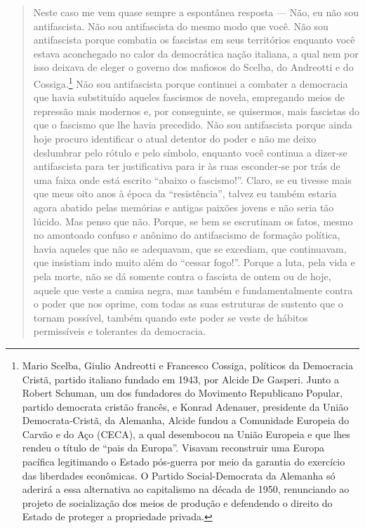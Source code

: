 \begin{quote}
Neste caso me vem quase sempre a espontânea resposta --- Não, eu não sou
antifascista. Não sou antifascista do mesmo modo que você. Não sou
antifascista porque combatia os fascistas em seus territórios enquanto
você estava aconchegado no calor da democrática nação italiana, a qual
nem por isso deixava de eleger o governo dos mafiosos do Scelba, do
Andreotti e do Cossiga.\footnote{Mario Scelba, Giulio Andreotti e Francesco Cossiga, políticos da
  Democracia Cristã, partido italiano fundado em 1943, por Alcide De
  Gasperi. Junto a Robert Schuman, um dos fundadores do Movimento
  Republicano Popular, partido democrata cristão francês, e Konrad
  Adenauer, presidente da União Democrata-Cristã, da Alemanha, Alcide
  fundou a Comunidade Europeia do Carvão e do Aço (CECA), a qual
  desembocou na União Europeia e que lhes rendeu o título de ``pais da
  Europa''. Visavam reconstruir uma Europa pacífica legitimando o Estado
  pós-guerra por meio da garantia do exercício das liberdades
  econômicas. O Partido Social-Democrata da Alemanha só aderirá a essa
  alternativa ao capitalismo na década de 1950, renunciando ao projeto
  de socialização dos meios de produção e defendendo o direito do Estado
  de proteger a propriedade privada.} Não sou antifascista porque continuei a combater a
democracia que havia substituído aqueles fascismos de novela, empregando
meios de repressão mais modernos e, por conseguinte, se quisermos, mais
fascistas do que o fascismo que lhe havia precedido. Não sou
antifascista porque ainda hoje procuro identificar o atual detentor do
poder e não me deixo deslumbrar pelo rótulo e pelo símbolo, enquanto
você continua a dizer-se antifascista para ter justificativa para ir às
ruas esconder-se por trás de uma faixa onde está escrito ``abaixo o
fascismo!''. Claro, se eu tivesse mais que meus oito anos à época da
``resistência'', talvez eu também estaria agora abatido pelas memórias e
antigas paixões jovens e não seria tão lúcido. Mas penso que não.
Porque, se bem se escrutinam os fatos, mesmo no amontoado confuso e
anônimo do antifascismo de formação política, havia aqueles que não se
adequavam, que se excediam, que continuavam, que insistiam indo muito
além do ``cessar fogo!''. Porque a luta, pela vida e pela morte, não se
dá somente contra o fascista de ontem ou de hoje, aquele que veste a
camisa negra, mas também e fundamentalmente contra o poder que nos
oprime, com todas as suas estruturas de sustento que o tornam possível,
também quando este poder se veste de hábitos permissíveis e tolerantes
da democracia.


\end{quote}
